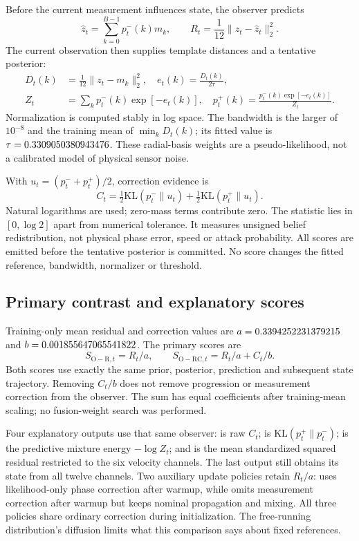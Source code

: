 Before the current measurement influences state, the observer predicts
\begin{equation}
 \widehat z_t=\sum_{k=0}^{B-1}p^-_t(k)m_k,\qquad
 R_t=\frac{1}{12}\|z_t-\widehat z_t\|_2^2.
 \label{eq:residual}
\end{equation}
The current observation then supplies template distances and a tentative posterior:
\begin{align}
 D_t(k)&=\frac{1}{12}\|z_t-m_k\|_2^2,\quad e_t(k)=\frac{D_t(k)}{2\tau},\\
 Z_t&=\sum_k p^-_t(k)\exp[-e_t(k)],\quad
 p^+_t(k)=\frac{p^-_t(k)\exp[-e_t(k)]}{Z_t}.
 \label{eq:posterior}
\end{align}
Normalization is computed stably in log space. The bandwidth is the larger of $10^{-8}$ and the training mean of $\min_k D_t(k)$; its fitted value is $\tau=0.3309050380943476$. These radial-basis weights are a pseudo-likelihood, not a calibrated model of physical sensor noise.

With $u_t=(p^-_t+p^+_t)/2$, correction evidence is
\begin{equation}
 C_t=\tfrac12\mathrm{KL}(p^-_t\|u_t)+\tfrac12\mathrm{KL}(p^+_t\|u_t).
 \label{eq:js}
\end{equation}
Natural logarithms are used; zero-mass terms contribute zero. The statistic lies in $[0,\log 2]$ apart from numerical tolerance. It measures unsigned belief redistribution, not physical phase error, speed or attack probability. All scores are emitted before the tentative posterior is committed. No score changes the fitted reference, bandwidth, normalizer or threshold.

\subsection{Primary contrast and explanatory scores}
Training-only mean residual and correction values are $a=0.3394252231379215$ and $b=0.001855647065541822$. The primary scores are
\begin{equation}
 S_{\mathrm{O-R},t}=R_t/a,\qquad
 S_{\mathrm{O-RC},t}=R_t/a+C_t/b.
 \label{eq:primary}
\end{equation}
Both scores use exactly the same prior, posterior, prediction and subsequent state trajectory. Removing $C_t/b$ does not remove progression or measurement correction from the observer. The sum has equal coefficients after training-mean scaling; no fusion-weight search was performed.

Four explanatory outputs use that same observer:  is raw $C_t$;  is $\mathrm{KL}(p^+_t\|p^-_t)$;  is the predictive mixture energy $-\log Z_t$; and  is the mean standardized squared residual restricted to the six velocity channels. The last output still obtains its state from all twelve channels. Two auxiliary update policies retain $R_t/a$:  uses likelihood-only phase correction after warmup, while  omits measurement correction after warmup but keeps nominal propagation and mixing. All three policies share ordinary correction during initialization. The free-running distribution's diffusion limits what this comparison says about fixed references.

